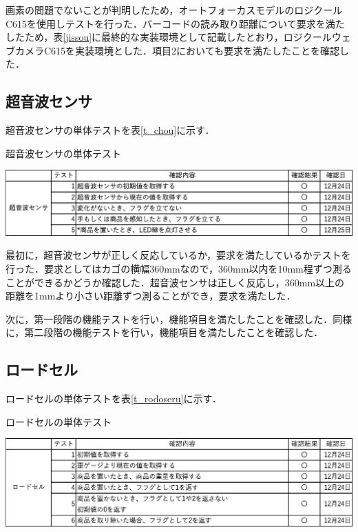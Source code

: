 画素の問題でないことが判明したため，オートフォーカスモデルのロジクールC615を使用しテストを行った．バーコードの読み取り距離について要求を満たしたため，表\ref{jissou}に最終的な実装環境として記載したとおり，ロジクールウェブカメラC615を実装環境とした．項目2においても要求を満たしたことを確認した．


\subsection*{超音波センサ}

超音波センサの単体テストを表\ref{t_chou}に示す．


\begin{table}[htbp]
\centering
\caption{超音波センサの単体テスト}
\includegraphics[width = 15cm]{./picture/tantai_chou.eps}
\label{t_chou}
\end{table}

最初に，超音波センサが正しく反応しているか，要求を満たしているかテストを行った．要求としてはカゴの横幅360mmなので，360mm以内を10mm程ずつ測ることができるかどうか確認した．超音波センサは正しく反応し，360mm以上の距離を1mmより小さい距離ずつ測ることができ，要求を満たした．

次に，第一段階の機能テストを行い，機能項目を満たしたことを確認した．同様に，第二段階の機能テストを行い，機能項目を満たしたことを確認した．

\subsection*{ロードセル}

ロードセルの単体テストを表\ref{t_rodoseru}に示す．


\begin{table}[htbp]
\centering
\caption{ロードセルの単体テスト}
\includegraphics[width = 15cm]{./picture/tantai_rodo.eps}
\label{t_rodoseru}
\end{table}

